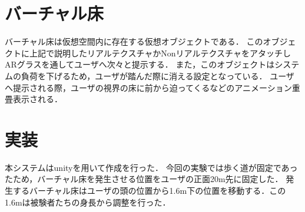 \section{バーチャル床}
バーチャル床は仮想空間内に存在する仮想オブジェクトである．
このオブジェクトに上記で説明したリアルテクスチャかNonリアルテクスチャをアタッチし
ARグラスを通してユーザへ次々と提示する．
また，このオブジェクトはシステムの負荷を下げるため，ユーザが踏んだ際に消える設定となっている．
ユーザへ提示される際，ユーザの視界の床に前から迫ってくるなどのアニメーション重畳表示される．

\section{実装}
本システムはunityを用いて作成を行った\cite{unity}．
今回の実験では歩く道が固定であったため，バーチャル床を発生させる位置をユーザの正面20m先に固定した．
発生するバーチャル床はユーザの頭の位置から1.6m下の位置を移動する．この1.6mは被験者たちの身長から調整を行った．